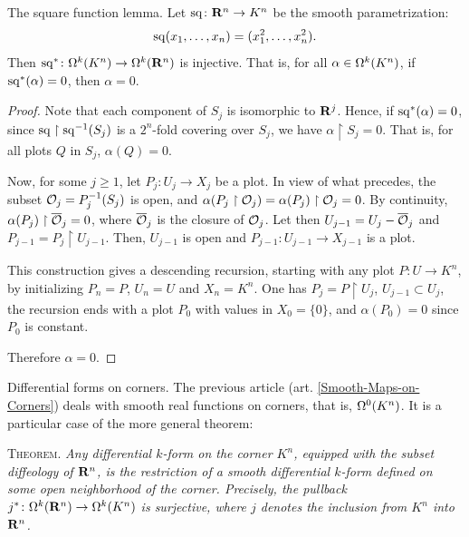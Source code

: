\begin{Article}{The square function lemma.}{}
  \label{The-Square-Function-Lemma}
  Let ${\operatorname{sq}} \colon \mathbf{R}^n \to K^n$ be the smooth parametrization:
  $$%
    \Sq(x_1,\dots,x_n) = (x_1^2,\dots,x_n^2).
  $$%
  Then ${\operatorname{sq}}^* \colon \Omega^k(K^n) \to \Omega^k(\mathbf{R}^n)$ is injective.
  That is,
  for all $\alpha \in \Omega^k(K^n)$,
  if ${\operatorname{sq}}^*(\alpha) = 0$,
  then $\alpha = 0$.
\end{Article}

\begin{proof}
  Note that each component of $S_j$ is isomorphic to $\mathbf{R}^j$.
  Hence,
  if ${\operatorname{sq}}^*(\alpha) = 0$,
  since ${\operatorname{sq}} \restriction {\operatorname{sq}}^{-1}(S_j)$ is a $2^n$-fold covering over $S_j$,
  we have $\alpha \restriction S_j = 0$.
  That is,
  for all plots $Q$ in $S_j$,
  $\alpha(Q)=0$.
  
  Now,
  for some $j \geq 1$,
  let $P_j \colon U_j \to X_j$ be a plot.
  In view of what precedes,
  the subset $\mathcal{O}_j = P_j^{-1}(S_j)$ is open,
  and $\alpha(P_j \restriction \mathcal{O}_j) = \alpha(P_j) \restriction \mathcal{O}_j = 0$.
  By continuity,
  $\alpha(P_j) \restriction \overline{\mathcal{O}}_j = 0$,
  where $\overline{\mathcal{O}}_j$ is the closure of $\mathcal{O}_j$.
  Let then $U_{j-1} = U_j - \overline{\mathcal{O}}_j$ and $P_{j-1} = P_j \restriction U_{j-1}$.
  Then,
  $U_{j-1}$ is open and $P_{j-1} \colon U_{j-1} \to X_{j-1}$ is a plot.
  
  This construction gives a descending recursion,
  starting with any plot $P \colon U \to K^n$,
  by initializing $P_n = P$,
  $U_n = U$ and $X_n = K^n$.
  One has $P_j = P \restriction U_j$,
  $U_{j-1} \subset U_j$,
  the recursion ends with a plot $P_0$ with values in $X_0 = \{0\}$,
  and $\alpha(P_0) = 0$ since $P_0$ is constant.
  
  Therefore $\alpha = 0$.
\end{proof}

\begin{Article}{Differential forms on corners.}{}
  \label{Differential-Forms-On-Corners}
  The previous article (art. \ref{Smooth-Maps-on-Corners}) deals with smooth real functions on corners,
  that is,
  $\Omega^0(K^n)$.
  It is a particular case of the more general theorem:
  
  \textsc{Theorem.} \itshape Any differential $k$-form on the corner $K^n$,
  equipped with the subset diffeology of $\mathbf{R}^n$,
  is the restriction of a smooth differential $k$-form defined on some open neighborhood of the corner.
  Precisely,
  the pullback $j^* \colon \Omega^k(\mathbf{R}^n) \to \Omega^k(K^n)$ is surjective,
  where $j$ denotes the inclusion from $K^n$ into $\mathbf{R}^n$.
\end{Article}

